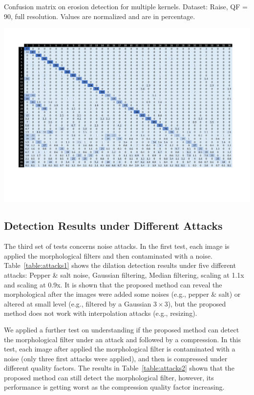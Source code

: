 \documentclass[review]{elsarticle}
\begin{document}
\begin{table}[t!]
	\centering
	\caption{Confusion matrix on erosion detection for multiple kernels. Dataset: Raise, QF = 90, full resolution. Values are normalized and are in percentage.}
	\label{table:confusion}
	\includegraphics[width=\linewidth]{confusion}
\end{table}

\subsection{Detection Results under Different Attacks}
\label{subsec:result_attacks}

The third set of tests concerns noise attacks. In the first test, each image is applied the morphological filters and then contaminated with a noise. Table~\ref{table:attacks1} shows the dilation detection results under five different attacks: Pepper \& salt noise, Gaussian filtering, Median filtering, scaling at 1.1x and scaling at 0.9x. It is shown that the proposed method can reveal the morphological after the images were added some noises (e.g., pepper \& salt) or altered at small level (e.g., filtered by a Gaussian $3 \times 3$), but the proposed method does not work with interpolation attacks (e.g., resizing). 

We applied a further test on understanding if the proposed method can detect the morphological filter under an attack and followed by a compression. In this test, each image after applied the morphological filter is contaminated with a noise (only three first attacks were applied), and then is compressed under different quality factors.  The results in Table~\ref{table:attacks2} shown that the proposed method can still detect the morphological filter, however, its performance is getting worst as the compression quality factor increasing.  
\end{document}
